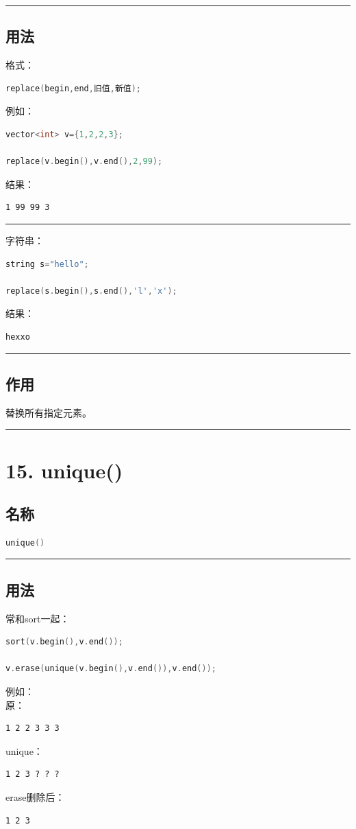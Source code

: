 \documentclass[9pt,twocolumn]{extarticle}
\begin{document}
\noindent\rule{\linewidth}{0.4pt}

\subsection{用法}
格式：
\begin{lstlisting}[language=C++]
replace(begin,end,旧值,新值);
\end{lstlisting}
例如：
\begin{lstlisting}[language=C++]
vector<int> v={1,2,2,3};

replace(v.begin(),v.end(),2,99);
\end{lstlisting}
结果：
\begin{lstlisting}
1 99 99 3
\end{lstlisting}

\noindent\rule{\linewidth}{0.4pt}

字符串：
\begin{lstlisting}[language=C++]
string s="hello";

replace(s.begin(),s.end(),'l','x');
\end{lstlisting}
结果：
\begin{lstlisting}
hexxo
\end{lstlisting}

\noindent\rule{\linewidth}{0.4pt}

\subsection{作用}
替换所有指定元素。

\noindent\rule{\linewidth}{0.4pt}

\section{15. unique()}

\subsection{名称}
\begin{lstlisting}[language=C++]
unique()
\end{lstlisting}

\noindent\rule{\linewidth}{0.4pt}

\subsection{用法}
常和sort一起：
\begin{lstlisting}[language=C++]
sort(v.begin(),v.end());

v.erase(unique(v.begin(),v.end()),v.end());
\end{lstlisting}
例如：\\
原：
\begin{lstlisting}
1 2 2 3 3 3
\end{lstlisting}
unique：
\begin{lstlisting}
1 2 3 ? ? ?
\end{lstlisting}
erase删除后：
\begin{lstlisting}
1 2 3
\end{lstlisting}
\end{document}
